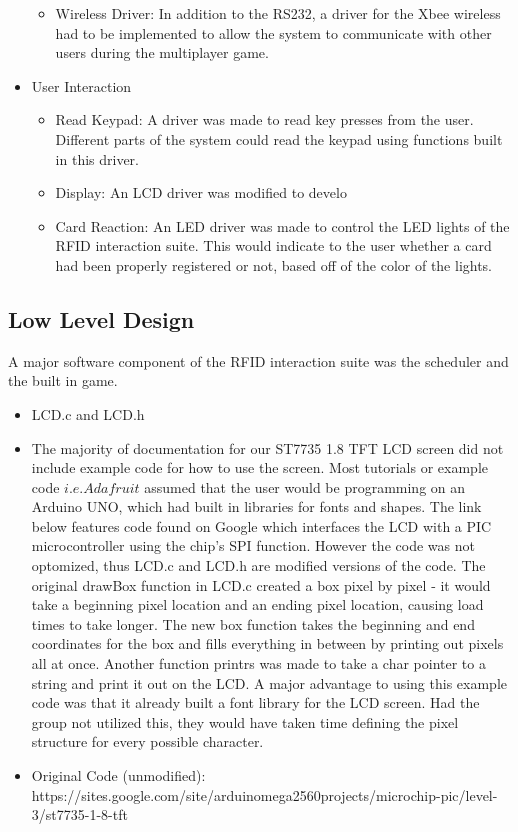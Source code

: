 \documentclass[12pt]{article} %
\begin{document}
\begin{itemize}
\begin{itemize}
			\item Wireless Driver: In addition to the RS232, a driver for the Xbee wireless had to be implemented to allow the system to communicate with other users during the multiplayer game.
		\end{itemize}	
	\item User Interaction
		\begin{itemize}
			\item Read Keypad: A driver was made to read key presses from the user. Different parts of the system could read the keypad using functions built in this driver.
			\item Display: An LCD driver was modified to develo
			\item Card Reaction: An LED driver was made to control the LED lights of the RFID interaction suite. This would indicate to the user whether a card had been properly registered or not, based off of the color of the lights.
		\end{itemize}
\end{itemize}


\subsection{Low Level Design}\label{swLowLevel} %
%

A major software component of the RFID interaction suite was the scheduler and the built in game.

\begin{itemize}
	\item LCD.c and LCD.h
	\item The majority of documentation for our ST7735 1.8 TFT LCD screen did not include example code for how to use the screen. Most tutorials or example code \(i.e. Adafruit\) assumed that the user would be programming on an Arduino UNO, which had built in libraries for fonts and shapes. The link below features code found on Google which interfaces the LCD with a PIC microcontroller using the chip's SPI function. However the code was not optomized, thus LCD.c and LCD.h are modified versions of the code. The original drawBox function in LCD.c created a box pixel by pixel - it would take a beginning pixel location and an ending pixel location, causing load times to take longer. The new box function takes the beginning and end coordinates for the box and fills everything in between by printing out pixels all at once. Another function printrs was made to take a char pointer to a string and print it out on the LCD. A major advantage to using this example code was that it already built a font library for the LCD screen. Had the group not utilized this, they would have taken time defining the pixel structure for every possible character. 
	\item Original Code (unmodified): https://sites.google.com/site/arduinomega2560projects/microchip-pic/level-3/st7735-1-8-tft
\end {itemize}
\end{document}
